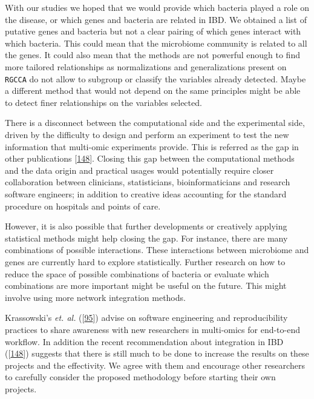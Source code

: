 \documentclass[
  12pt,
  a4paper,
  twoside,
  openright]{book}
\begin{document}
With our studies we hoped that we would provide which bacteria played a role on the disease, or which genes and bacteria are related in IBD.
We obtained a list of putative genes and bacteria but not a clear pairing of which genes interact with which bacteria.
This could mean that the microbiome community is related to all the genes.
It could also mean that the methods are not powerful enough to find more tailored relationships as normalizations and generalizations present on \texttt{RGCCA} do not allow to subgroup or classify the variables already detected.
Maybe a different method that would not depend on the same principles might be able to detect finer relationships on the variables selected.

There is a disconnect between the computational side and the experimental side, driven by the difficulty to design and perform an experiment to test the new information that multi-omic experiments provide.
This is referred as the gap in other publications {[}\protect\hyperlink{ref-sudhakar2022}{148}{]}.
Closing this gap between the computational methods and the data origin and practical usages would potentially require closer collaboration between clinicians, statisticians, bioinformaticians and research software engineers; in addition to creative ideas accounting for the standard procedure on hospitals and points of care.

However, it is also possible that further developments or creatively applying statistical methods might help closing the gap.
For instance, there are many combinations of possible interactions.
These interactions between microbiome and genes are currently hard to explore statistically.
Further research on how to reduce the space of possible combinations of bacteria or evaluate which combinations are more important might be useful on the future.
This might involve using more network integration methods.

Krassowski's \emph{et. al.} ({[}\protect\hyperlink{ref-krassowski2020}{95}{]}) advise on software engineering and reproducibility practices to share awareness with new researchers in multi-omics for end-to-end workflow.
In addition the recent recommendation about integration in IBD ({[}\protect\hyperlink{ref-sudhakar2022}{148}{]}) suggests that there is still much to be done to increase the results on these projects and the effectivity.
We agree with them and encourage other researchers to carefully consider the proposed methodology before starting their own projects.
\end{document}
